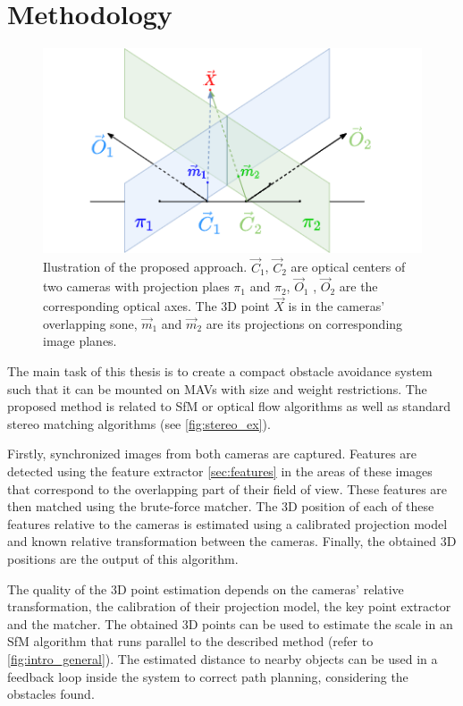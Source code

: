 \chapter{Methodology}

\label{chapter:methodology}

\begin{figure}[h]
    \centering
    \includegraphics[width=.8\textwidth]{graphics/td90deg.png}
    \caption[The proposed approach model.]{Ilustration of the proposed approach. $\vec{C}_1$, $\vec{C}_2$ are optical centers of two cameras with projection plaes $\pi_1$ and $\pi_2$, $\vec{O}_1$ , $\vec{O}_2$ are the corresponding optical axes. The 3D point $\vec{X}$ is in the cameras' overlapping sone, $\vec{m}_1$ and $\vec{m}_2$ are its projections on corresponding image planes.}
    \label{fig:td90deg}
\end{figure}

The main task of this thesis is to create a compact obstacle avoidance system such that it can be mounted on MAVs with size and weight restrictions.
The proposed method is related to SfM or optical flow algorithms as well as standard stereo matching algorithms (see \autoref{fig:stereo_ex}).

Firstly, synchronized images from both cameras are captured. Features are detected using the feature extractor \autoref{sec:features} in the areas of these images that correspond to the overlapping part of their field of view. 
These features are then matched using the brute-force matcher.
The 3D position of each of these features relative to the cameras is estimated using a calibrated projection model and known relative transformation between the cameras.
Finally, the obtained 3D positions are the output of this algorithm. 

The quality of the 3D point estimation depends on the cameras' relative transformation, the calibration of their projection model, the key point extractor and the matcher.
The obtained 3D points can be used to estimate the scale in an SfM algorithm that runs parallel to the described method (refer to  \autoref{fig:intro_general}).
The estimated distance to nearby objects can be used in a feedback loop inside the system to correct path planning, considering the obstacles found.

